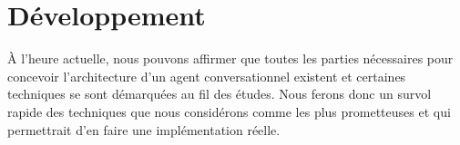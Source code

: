 \section{Développement}
À l'heure actuelle, nous pouvons affirmer que toutes les parties nécessaires  pour concevoir l'architecture d'un agent conversationnel existent et certaines techniques se sont démarquées au fil des études. Nous ferons donc un survol rapide des techniques que nous considérons comme les plus prometteuses et qui permettrait d'en faire une implémentation réelle.






